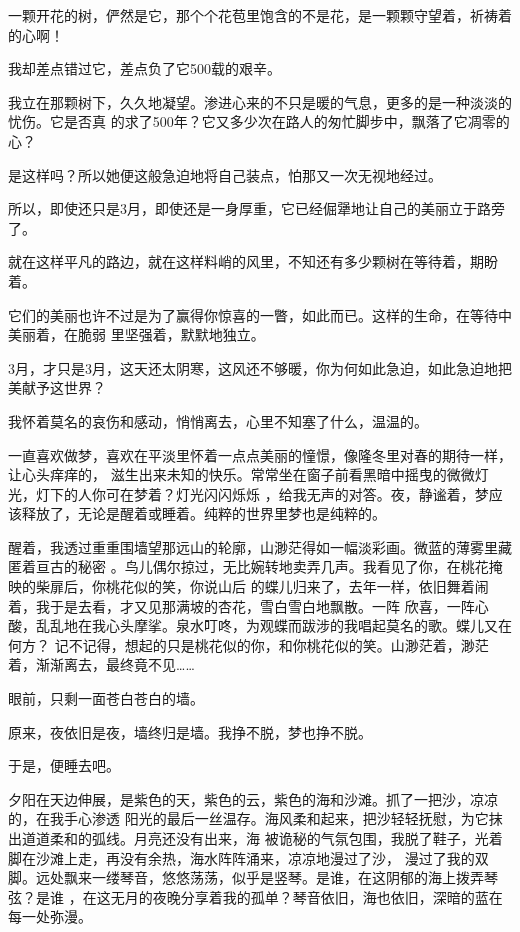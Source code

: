 \documentclass[12pt,a4paper]{article}
\begin{document}
		一颗开花的树，俨然是它，那个个花苞里饱含的不是花，是一颗颗守望着，祈祷着的心啊！

		我却差点错过它，差点负了它500载的艰辛。

		我立在那颗树下，久久地凝望。渗进心来的不只是暖的气息，更多的是一种淡淡的忧伤。它是否真
	的求了500年？它又多少次在路人的匆忙脚步中，飘落了它凋零的心？

		是这样吗？所以她便这般急迫地将自己装点，怕那又一次无视地经过。

		所以，即使还只是3月，即使还是一身厚重，它已经倔犟地让自己的美丽立于路旁了。

		就在这样平凡的路边，就在这样料峭的风里，不知还有多少颗树在等待着，期盼着。

		它们的美丽也许不过是为了赢得你惊喜的一瞥，如此而已。这样的生命，在等待中美丽着，在脆弱
	里坚强着，默默地独立。

		3月，才只是3月，这天还太阴寒，这风还不够暖，你为何如此急迫，如此急迫地把美献予这世界？

		我怀着莫名的哀伤和感动，悄悄离去，心里不知塞了什么，温温的。

	\endwriting



		一直喜欢做梦，喜欢在平淡里怀着一点点美丽的憧憬，像隆冬里对春的期待一样，让心头痒痒的，
	滋生出来未知的快乐。常常坐在窗子前看黑暗中摇曳的微微灯光，灯下的人你可在梦着？灯光闪闪烁烁
	，给我无声的对答。夜，静谧着，梦应该释放了，无论是醒着或睡着。纯粹的世界里梦也是纯粹的。

		醒着，我透过重重围墙望那远山的轮廓，山渺茫得如一幅淡彩画。微蓝的薄雾里藏匿着亘古的秘密
	。鸟儿偶尔掠过，无比婉转地卖弄几声。我看见了你，在桃花掩映的柴扉后，你桃花似的笑，你说山后
	的蝶儿归来了，去年一样，依旧舞着闹着，我于是去看，才又见那满坡的杏花，雪白雪白地飘散。一阵
	欣喜，一阵心酸，乱乱地在我心头摩挲。泉水叮咚，为观蝶而跋涉的我唱起莫名的歌。蝶儿又在何方？
	记不记得，想起的只是桃花似的你，和你桃花似的笑。山渺茫着，渺茫着，渐渐离去，最终竟不见……

		眼前，只剩一面苍白苍白的墙。

		原来，夜依旧是夜，墙终归是墙。我挣不脱，梦也挣不脱。

		于是，便睡去吧。

		夕阳在天边伸展，是紫色的天，紫色的云，紫色的海和沙滩。抓了一把沙，凉凉的，在我手心渗透
	阳光的最后一丝温存。海风柔和起来，把沙轻轻抚慰，为它抹出道道柔和的弧线。月亮还没有出来，海
	被诡秘的气氛包围，我脱了鞋子，光着脚在沙滩上走，再没有余热，海水阵阵涌来，凉凉地漫过了沙，
	漫过了我的双脚。远处飘来一缕琴音，悠悠荡荡，似乎是竖琴。是谁，在这阴郁的海上拨弄琴弦？是谁
	，在这无月的夜晚分享着我的孤单？琴音依旧，海也依旧，深暗的蓝在每一处弥漫。
\end{document}
